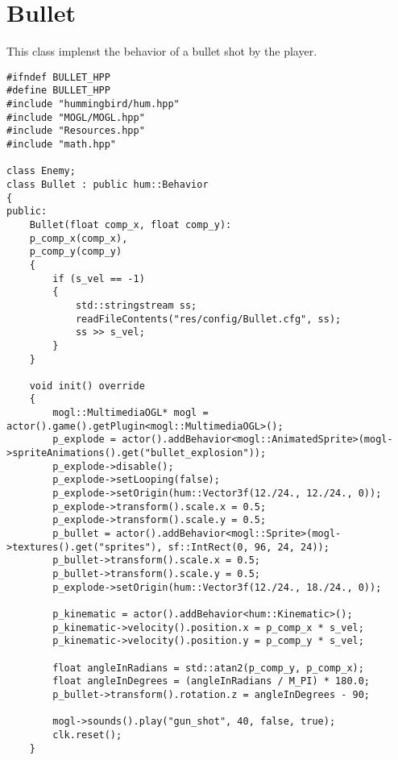 \section{Bullet}

This class implenst the behavior of a bullet shot by the player.

\begin{lstlisting}
#ifndef BULLET_HPP
#define BULLET_HPP
#include "hummingbird/hum.hpp"
#include "MOGL/MOGL.hpp"
#include "Resources.hpp"
#include "math.hpp"

class Enemy;
class Bullet : public hum::Behavior
{
public:
    Bullet(float comp_x, float comp_y):
    p_comp_x(comp_x),
    p_comp_y(comp_y)
    {
        if (s_vel == -1)
        {
            std::stringstream ss;
            readFileContents("res/config/Bullet.cfg", ss);
            ss >> s_vel;
        }
    }

    void init() override
    {
        mogl::MultimediaOGL* mogl = actor().game().getPlugin<mogl::MultimediaOGL>();
        p_explode = actor().addBehavior<mogl::AnimatedSprite>(mogl->spriteAnimations().get("bullet_explosion"));
        p_explode->disable();
        p_explode->setLooping(false);
        p_explode->setOrigin(hum::Vector3f(12./24., 12./24., 0));
        p_explode->transform().scale.x = 0.5;
        p_explode->transform().scale.y = 0.5;
        p_bullet = actor().addBehavior<mogl::Sprite>(mogl->textures().get("sprites"), sf::IntRect(0, 96, 24, 24));
        p_bullet->transform().scale.x = 0.5;
        p_bullet->transform().scale.y = 0.5;
        p_explode->setOrigin(hum::Vector3f(12./24., 18./24., 0));

        p_kinematic = actor().addBehavior<hum::Kinematic>();
        p_kinematic->velocity().position.x = p_comp_x * s_vel;
        p_kinematic->velocity().position.y = p_comp_y * s_vel;

        float angleInRadians = std::atan2(p_comp_y, p_comp_x);
        float angleInDegrees = (angleInRadians / M_PI) * 180.0;
        p_bullet->transform().rotation.z = angleInDegrees - 90;

        mogl->sounds().play("gun_shot", 40, false, true);
        clk.reset();
    }
\end{lstlisting}

